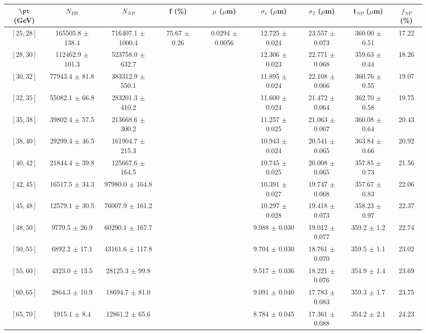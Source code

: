 \begin{tabular}{c||c|c|c|c|c|c|c||c}
$\pt$ (GeV) & $N_{PR}$ & $N_{NP}$ & f (\%) & $\mu$ ($\mu$m) & $\sigma_1$ ($\mu$m) & $\sigma_2$ ($\mu$m)  & t$_{NP}$ ($\mu$m) & $f_{NP}$ (\%) \\
\hline
$[25, 28]$ & 165505.8 $\pm$ 138.4 & 716407.1 $\pm$ 1000.4 & \multirow{19}{*}{75.67 $\pm$ 0.26} & \multirow{19}{*}{0.0294 $\pm$ 0.0056} & 12.725 $\pm$ 0.024 & 23.557 $\pm$ 0.073 & 360.00 $\pm$ 0.51 & 17.22\\
$[28, 30]$ & 112462.9 $\pm$ 101.3 & 523758.0 $\pm$ 632.7 &  &  & 12.306 $\pm$ 0.023 & 22.771 $\pm$ 0.068 & 359.63 $\pm$ 0.44 & 18.26\\
$[30, 32]$ & 77943.4 $\pm$ 81.8 & 383312.9 $\pm$ 550.1 &  &  & 11.895 $\pm$ 0.024 & 22.108 $\pm$ 0.066 & 360.76 $\pm$ 0.55 & 19.07\\
$[32, 35]$ & 55082.1 $\pm$ 66.8 & 283201.3 $\pm$ 410.2 &  &  & 11.600 $\pm$ 0.024 & 21.472 $\pm$ 0.064 & 362.70 $\pm$ 0.58 & 19.75\\
$[35, 38]$ & 39802.4 $\pm$ 57.5 & 213668.6 $\pm$ 300.2 &  &  & 11.257 $\pm$ 0.025 & 21.063 $\pm$ 0.067 & 360.08 $\pm$ 0.64 & 20.43\\
$[38, 40]$ & 29299.4 $\pm$ 46.5 & 161904.7 $\pm$ 215.3 &  &  & 10.943 $\pm$ 0.024 & 20.541 $\pm$ 0.065 & 363.84 $\pm$ 0.66 & 20.92\\
$[40, 42]$ & 21844.4 $\pm$ 39.8 & 125667.6 $\pm$ 164.5 &  &  & 10.745 $\pm$ 0.025 & 20.008 $\pm$ 0.065 & 357.85 $\pm$ 0.73 & 21.56\\
$[42, 45]$ & 16517.5 $\pm$ 34.3 & 97980.0 $\pm$ 164.8 &  &  & 10.391 $\pm$ 0.027 & 19.747 $\pm$ 0.068 & 357.67 $\pm$ 0.83 & 22.06\\
$[45, 48]$ & 12579.1 $\pm$ 30.5 & 76007.9 $\pm$ 161.2 &  &  & 10.297 $\pm$ 0.028 & 19.418 $\pm$ 0.073 & 358.23 $\pm$ 0.97 & 22.37\\
$[48, 50]$ & 9779.5 $\pm$ 26.9 & 60290.1 $\pm$ 167.7 &  &  & 9.988 $\pm$ 0.030 & 19.012 $\pm$ 0.077 & 359.2 $\pm$ 1.2 & 22.74\\
$[50, 55]$ & 6892.2 $\pm$ 17.1 & 43161.6 $\pm$ 117.8 &  &  & 9.704 $\pm$ 0.030 & 18.761 $\pm$ 0.070 & 359.5 $\pm$ 1.1 & 23.02\\
$[55, 60]$ & 4323.0 $\pm$ 13.5 & 28125.3 $\pm$ 99.8 &  &  & 9.517 $\pm$ 0.036 & 18.221 $\pm$ 0.076 & 354.9 $\pm$ 1.4 & 23.69\\
$[60, 65]$ & 2864.3 $\pm$ 10.9 & 18694.7 $\pm$ 81.0 &  &  & 9.091 $\pm$ 0.040 & 17.783 $\pm$ 0.083 & 359.3 $\pm$ 1.7 & 23.75\\
$[65, 70]$ & 1915.1 $\pm$ 8.4 & 12861.2 $\pm$ 65.6 &  &  & 8.784 $\pm$ 0.045 & 17.361 $\pm$ 0.088 & 354.2 $\pm$ 2.1 & 24.23\\

\end{tabular}
